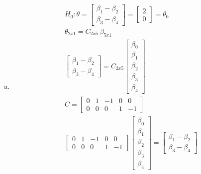 \documentclass{article}
\newcommand{\B}{\beta}
\begin{document}
\begin{flushleft}
\begin{enumerate}[(a)]
	\item 
\begin{multline*}\\
H_0:\theta=\left[\begin{array}{r}
\B_1-\B_2\\
\B_3-\B_4
\end{array}\right]=\left[\begin{array}{r}
2\\
0
\end{array}\right]=\theta_0\\
\theta_{2x1}=C_{2x5} \ \B_{5x1}\\
\left[\begin{array}{r}
\B_1-\B_2\\
\B_3-\B_4
\end{array}\right]=C_{2x5}\left[\begin{array}{r}
\B_0\\
\B_1\\
\B_2\\
\B_3\\
\B_4
\end{array}\right]\\
C=\left[\begin{array}{rrrrr}
0&1&-1&0&0\\
0&0&0&1&-1
\end{array}\right]\\
\left[\begin{array}{rrrrr}
0&1&-1&0&0\\
0&0&0&1&-1
\end{array}\right]\left[\begin{array}{r}
\B_0\\
\B_1\\
\B_2\\
\B_3\\
\B_4
\end{array}\right]=\left[\begin{array}{r}
\B_1-\B_2\\
\B_3-\B_4
\end{array}\right]\\
\end{multline*}


\end{enumerate}
\end{flushleft}
\end{document}
